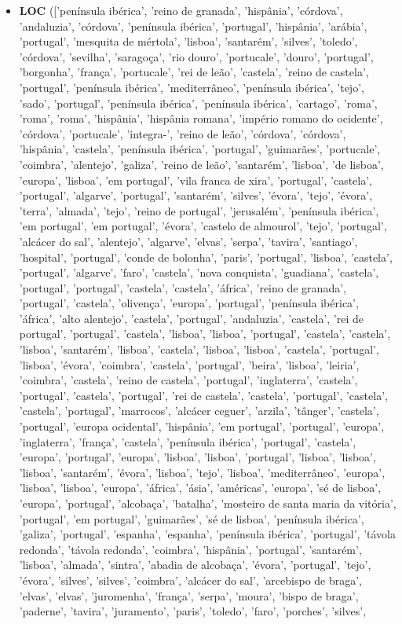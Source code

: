 \documentclass{article}
\begin{document}
\begin{itemize}
\item \textbf{LOC} (['península ibérica', 'reino de granada', 'hispânia', 'córdova', 'andaluzia', 'córdova', 'península ibérica', 'portugal', 'hispânia', 'arábia', 'portugal', 'mesquita de mértola', 'lisboa', 'santarém', 'silves', 'toledo', 'córdova', 'sevilha', 'saragoça', 'rio douro', 'portucale', 'douro', 'portugal', 'borgonha', 'frança', 'portucale', 'rei de leão', 'castela', 'reino de castela', 'portugal', 'península ibérica', 'mediterrâneo', 'península ibérica', 'tejo', 'sado', 'portugal', 'península ibérica', 'península ibérica', 'cartago', 'roma', 'roma', 'roma', 'hispânia', 'hispânia romana', 'império romano do ocidente', 'córdova', 'portucale', 'integra-', 'reino de leão', 'córdova', 'córdova', 'hispânia', 'castela', 'península ibérica', 'portugal', 'guimarães', 'portucale', 'coimbra', 'alentejo', 'galiza', 'reino de leão', 'santarém', 'lisboa', 'de lisboa', 'europa', 'lisboa', 'em portugal', 'vila franca de xira', 'portugal', 'castela', 'portugal', 'algarve', 'portugal', 'santarém', 'silves', 'évora', 'tejo', 'évora', 'terra', 'almada', 'tejo', 'reino de portugal', 'jerusalém', 'península ibérica', 'em portugal', 'em portugal', 'évora', 'castelo de almourol', 'tejo', 'portugal', 'alcácer do sal', 'alentejo', 'algarve', 'elvas', 'serpa', 'tavira', 'santiago', 'hospital', 'portugal', 'conde de bolonha', 'paris', 'portugal', 'lisboa', 'castela', 'portugal', 'algarve', 'faro', 'castela', 'nova conquista', 'guadiana', 'castela', 'portugal', 'portugal', 'castela', 'castela', 'áfrica', 'reino de granada', 'portugal', 'castela', 'olivença', 'europa', 'portugal', 'península ibérica', 'áfrica', 'alto alentejo', 'castela', 'portugal', 'andaluzia', 'castela', 'rei de portugal', 'portugal', 'castela', 'lisboa', 'lisboa', 'portugal', 'castela', 'castela', 'lisboa', 'santarém', 'lisboa', 'castela', 'lisboa', 'lisboa', 'castela', 'portugal', 'lisboa', 'évora', 'coimbra', 'castela', 'portugal', 'beira', 'lisboa', 'leiria', 'coimbra', 'castela', 'reino de castela', 'portugal', 'inglaterra', 'castela', 'portugal', 'castela', 'portugal', 'rei de castela', 'castela', 'portugal', 'castela', 'castela', 'portugal', 'marrocos', 'alcácer ceguer', 'arzila', 'tânger', 'castela', 'portugal', 'europa ocidental', 'hispânia', 'em portugal', 'portugal', 'europa', 'inglaterra', 'frança', 'castela', 'península ibérica', 'portugal', 'castela', 'europa', 'portugal', 'europa', 'lisboa', 'lisboa', 'portugal', 'lisboa', 'lisboa', 'lisboa', 'santarém', 'évora', 'lisboa', 'tejo', 'lisboa', 'mediterrâneo', 'europa', 'lisboa', 'lisboa', 'europa', 'áfrica', 'ásia', 'américas', 'europa', 'sé de lisboa', 'europa', 'portugal', 'alcobaça', 'batalha', 'mosteiro de santa maria da vitória', 'portugal', 'em portugal', 'guimarães', 'sé de lisboa', 'península ibérica', 'galiza', 'portugal', 'espanha', 'espanha', 'península ibérica', 'portugal', 'távola redonda', 'távola redonda', 'coimbra', 'hispânia', 'portugal', 'santarém', 'lisboa', 'almada', 'sintra', 'abadia de alcobaça', 'évora', 'portugal', 'tejo', 'évora', 'silves', 'silves', 'coimbra', 'alcácer do sal', 'arcebispo de braga', 'elvas', 'elvas', 'juromenha', 'frança', 'serpa', 'moura', 'bispo de braga', 'paderne', 'tavira', 'juramento', 'paris', 'toledo', 'faro', 'porches', 'silves', 
\end{itemize}
\end{document}
